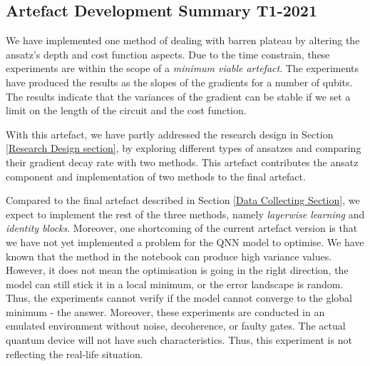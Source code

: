 \subsection{Artefact Development Summary T1-2021}
We have implemented one method of dealing with barren plateau by altering the ansatz's depth and cost function aspects.
Due to the time constrain, these experiments are within the scope of a \textit{minimum viable artefact}.
The experiments have produced the results as the slopes of the gradients for a number of qubits.
The results indicate that the variances of the gradient can be stable if we set a limit on the length of the circuit and the cost function.

With this artefact, we have partly addressed the research design in Section \ref{Research Design section}, by exploring different types of ansatzes and comparing their gradient decay rate with two methods.
This artefact contributes the ansatz component and implementation of two methods to the final artefact.

Compared to the final artefact described in Section \ref{Data Collecting Section}, we expect to implement the rest of the three methods, namely \textit{layerwise learning} and \textit{identity blocks}.
Moreover, one shortcoming of the current artefact version is that we have not yet implemented a problem for the QNN model to optimise.
We have known that the method in the notebook can produce high variance values.
However, it does not mean the optimisation is going in the right direction, the model can still stick it in a local minimum, or the error landscape is random.
Thus, the experiments cannot verify if the model cannot converge to the global minimum - the answer.
Moreover, these experiments are conducted in an emulated environment without noise, decoherence, or faulty gates.
The actual quantum device will not have such characteristics.
Thus, this experiment is not reflecting the real-life situation.